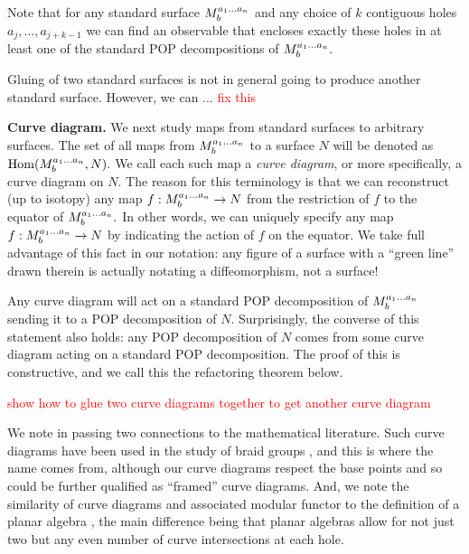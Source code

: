 \documentclass[aps, prl, letterpaper, twocolumn, superscriptaddress, notitlepage, 10pt]{revtex4-1}
\newcommand{\simon}[1]{\textcolor{red}{#1}}
\newcommand{\F}{\mathscr{H}} %
\newcommand{\Hom}{{\mathrm{Hom}}}
\newcommand{\subsub}[1]{{\bf #1}}
\begin{document}
Note that for any standard surface $M^{a_1...a_n}_{b}$ 
and any choice of $k$ contiguous holes $a_j,...,a_{j+k-1}$
we can find an observable that encloses exactly these holes
in at least one of the standard POP decompositions of $M^{a_1...a_n}_{b}.$ 

Gluing of two standard surfaces is not in general going to
produce another standard surface. However, we can ... \simon{fix this}

\subsub{Curve diagram.}
We next study maps from standard surfaces to arbitrary surfaces.
The set of all maps from $M^{a_1...a_n}_{b}$ 
to a surface $N$ will be denoted as $\Hom(\StdM, N).$ 
We call each such map a \emph{curve diagram},
or more specifically, a curve diagram on $N$.
The reason for this terminology is that we can reconstruct (up to isotopy)
any map $f:M^{a_1...a_n}_{b}\to N$ from
the restriction of $f$ to the equator of $M^{a_1...a_n}_{b}.$ 
In other words, we can uniquely specify any map
$f:M^{a_1...a_n}_{b}\to N$ by indicating the action of
$f$ on the equator. We take full advantage of this
fact in our notation: any figure of a surface
with a ``green line'' drawn therein is actually notating a 
diffeomorphism, not a surface!

Any curve diagram will act on a standard POP decomposition
of $M^{a_1...a_n}_{b}$ sending it to a POP decomposition of $N.$
Surprisingly, the converse of this statement also holds:
any POP decomposition of $N$ comes from some curve diagram
acting on a standard POP decomposition.
The proof of this is constructive, and we call this
the refactoring theorem below.

\simon{show how to glue two curve diagrams together to get another
curve diagram}


We note in passing two connections to the mathematical literature.
Such curve diagrams have been 
used in the study of braid groups \cite{Dehornoy2002}, and this
is where the name comes from, although our
curve diagrams respect the base points and so could be further
qualified as ``framed'' curve diagrams.
And, we note the similarity of curve diagrams and associated
modular functor 
to the definition of a planar algebra \cite{Jones1999},
the main difference being that planar algebras allow for 
not just two but any even number of curve intersections at each hole.
\end{document}

